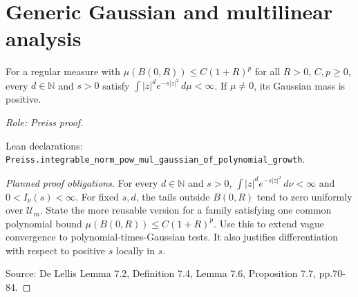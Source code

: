 \section{Generic Gaussian and multilinear analysis}

\begin{lemma}
\label{lem:gaussian-polynomial-integrable}



For a regular measure with $\mu(B(0,R))\leq C(1+R)^p$ for all $R>0$, $C,p\geq0$, every $d\in\mathbb N$ and $s>0$ satisfy $\int |z|^d e^{-s|z|^2}\,d\mu<\infty$. If $\mu\ne0$, its Gaussian mass is positive.
\par\emph{Role: Preiss proof.}
\par Lean declarations: \texttt{Preiss.integrable\_norm\_pow\_mul\_gaussian\_of\_polynomial\_growth}.
\end{lemma}
\begin{proof}[Planned proof obligations]
For every $d\in\mathbb N$ and $s>0$,
$\int |z|^d e^{-s|z|^2}\,d\nu<\infty$ and $0<I_\nu(s)<\infty$.
For fixed $s,d$, the tails outside $B(0,R)$ tend to zero uniformly over
$\mathcal U_m$. State the more reusable version for a family satisfying one
common polynomial bound $\mu(B(0,R))\leq C(1+R)^p$.
Use this to extend vague convergence to polynomial-times-Gaussian tests.
It also justifies differentiation with respect to positive $s$ locally in $s$.
\par Source: De Lellis Lemma 7.2, Definition 7.4, Lemma 7.6, Proposition 7.7, pp.70-84.
\end{proof}

